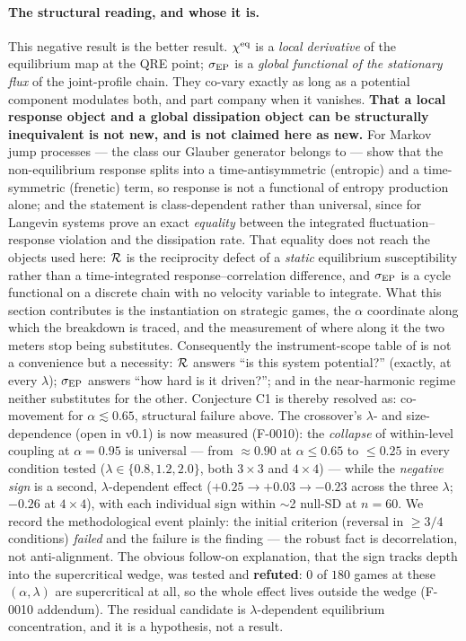 \paragraph{The structural reading, and whose it is.} This negative result is the
better result. $\chi^{\mathrm{eq}}$ is a \emph{local derivative} of the equilibrium map at
the QRE point; $\sigma_{\mathrm{EP}}$ is a \emph{global functional of the stationary flux} of
the joint-profile chain. They co-vary exactly as long as a potential component
modulates both, and part company when it vanishes. \textbf{That a local response
object and a global dissipation object can be structurally inequivalent is not
new, and is not claimed here as new.} For Markov jump processes --- the class our
Glauber generator belongs to --- \citet{baiesi2009} show that the non-equilibrium
response splits into a time-antisymmetric (entropic) and a time-symmetric
(frenetic) term, so response is not a functional of entropy production alone; and
the statement is class-dependent rather than universal, since for Langevin systems
\citet{haradasasa2005} prove an exact \emph{equality} between the integrated
fluctuation--response violation and the dissipation rate. That equality does not
reach the objects used here: $\mathcal{R}$ is the reciprocity defect of a \emph{static}
equilibrium susceptibility rather than a time-integrated response--correlation
difference, and $\sigma_{\mathrm{EP}}$ is a cycle functional on a discrete chain with no velocity
variable to integrate. What this section contributes is the instantiation on
strategic games, the $\alpha$ coordinate along which the breakdown is traced, and
the measurement of where along it the two meters stop being substitutes. Consequently the
instrument-scope table of \citep{p1} is not a convenience but a necessity:
$\mathcal{R}$ answers ``is this system potential?'' (exactly, at every $\lambda$);
$\sigma_{\mathrm{EP}}$ answers ``how hard is it driven?''; and in the near-harmonic regime
neither substitutes for the other. Conjecture C1 is thereby resolved as:
co-movement for $\alpha \lesssim 0.65$, structural failure above. The
crossover's $\lambda$- and size-dependence (open in v0.1) is now measured
(F-0010): the \emph{collapse} of within-level coupling at $\alpha = 0.95$
is universal --- from $\approx 0.90$ at $\alpha \le 0.65$ to $\le 0.25$
in every condition tested ($\lambda \in \{0.8, 1.2, 2.0\}$, both $3\times
3$ and $4\times 4$) --- while the \emph{negative sign} is a second,
$\lambda$-dependent effect ($+0.25 \to +0.03 \to -0.23$ across the three
$\lambda$; $-0.26$ at $4\times 4$), with each individual sign within
$\sim$2 null-SD at $n = 60$. We record the methodological event plainly:
the initial criterion (reversal in $\ge 3/4$ conditions) \emph{failed} and
the failure is the finding --- the robust fact is decorrelation, not
anti-alignment. The obvious follow-on explanation, that the sign tracks depth
into the supercritical wedge, was tested and \textbf{refuted}: $0$ of $180$
games at these $(\alpha,\lambda)$ are supercritical at all, so the whole
effect lives outside the wedge (F-0010 addendum). The residual candidate is
$\lambda$-dependent equilibrium concentration, and it is a hypothesis, not a
result.
